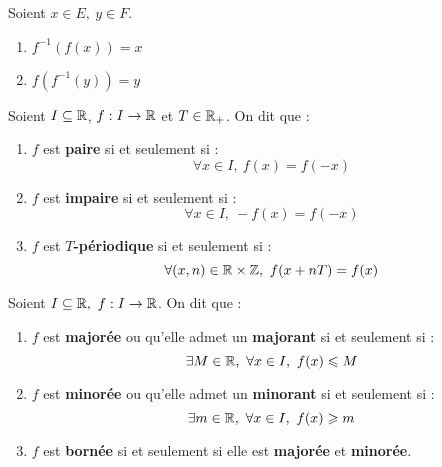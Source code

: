 \begin{proposition}
	Soient $x \in E,\ y \in F$.
    \begin{multicols}{2}
        \begin{enumerate}
            \item $f^{-1} (f(x)) = x$
            \item $f(f^{-1}(y)) = y$
        \end{enumerate}
    \end{multicols}
\end{proposition}

\begin{definition}
	Soient $I \subseteq \mathbb{R}$, $f : I \to \mathbb{R}$ et $T \in \mathbb{R}_+$. On dit que :
    \begin{enumerate}
        \item $f$ est \textbf{paire} si et seulement si : 
        \[ \forall x \in I,\ f(x) = f(-x) \]
        \item $f$ est \textbf{impaire} si et seulement si  :
        \[ \forall x \in I,\ -f(x) = f(-x) \]
        \item $f$ est \textbf{$T$-périodique} si et seulement si :
        \[ \forall (x, n) \in \mathbb{R} \times \mathbb{Z},\ f(x + nT) = f(x) \]
    \end{enumerate}
\end{definition}

\begin{definition}
	Soient $I \subseteq \mathbb{R},\ f : I \to \mathbb{R}$. On dit que :
	\begin{enumerate}
	    \item $f$ est \textbf{majorée} ou qu'elle admet un \textbf{majorant} si et seulement si : 
	    \[ \exists M \in \mathbb{R},\ \forall x \in I,\ f(x) \leqslant M \]
        \item $f$ est \textbf{minorée} ou qu'elle admet un \textbf{minorant} si et seulement si :
        \[ \exists m \in \mathbb{R},\ \forall x \in I,\ f(x) \geqslant m \]
        \item $f$ est \textbf{bornée} si et seulement si elle est \textbf{majorée} et \textbf{minorée}.
	\end{enumerate}
\end{definition}

